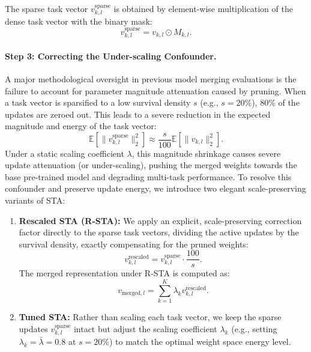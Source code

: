 The sparse task vector $v^{\text{sparse}}_{k, l}$ is obtained by element-wise multiplication of the dense task vector with the binary mask:
\begin{equation}
    v^{\text{sparse}}_{k, l} = v_{k, l} \odot M_{k, l}.
\end{equation}

\paragraph{Step 3: Correcting the Under-scaling Confounder.}
A major methodological oversight in previous model merging evaluations is the failure to account for parameter magnitude attenuation caused by pruning. When a task vector is sparsified to a low survival density $s$ (e.g., $s = 20\%$), 80\% of the updates are zeroed out. This leads to a severe reduction in the expected magnitude and energy of the task vector:
\begin{equation}
    \mathbb{E}[\|v^{\text{sparse}}_{k, l}\|_2^2] \approx \frac{s}{100} \mathbb{E}[\|v_{k, l}\|_2^2].
\end{equation}
Under a static scaling coefficient $\lambda$, this magnitude shrinkage causes severe update attenuation (or under-scaling), pushing the merged weights towards the base pre-trained model and degrading multi-task performance. To resolve this confounder and preserve update energy, we introduce two elegant scale-preserving variants of STA:
\begin{enumerate}
    \item \textbf{Rescaled STA (R-STA):} We apply an explicit, scale-preserving correction factor directly to the sparse task vectors, dividing the active updates by the survival density, exactly compensating for the pruned weights:
    \begin{equation}
        v^{\text{rescaled}}_{k, l} = v^{\text{sparse}}_{k, l} \cdot \frac{100}{s}.
    \end{equation}
    The merged representation under R-STA is computed as:
    \begin{equation}
        v_{\text{merged}, l} = \sum_{k=1}^K \lambda_k v^{\text{rescaled}}_{k, l}.
    \end{equation}
    \item \textbf{Tuned STA:} Rather than scaling each task vector, we keep the sparse updates $v^{\text{sparse}}_{k, l}$ intact but adjust the scaling coefficient $\lambda_k$ (e.g., setting $\lambda_k = \bar{\lambda} = 0.8$ at $s = 20\%$) to match the optimal weight space energy level.
\end{enumerate}

